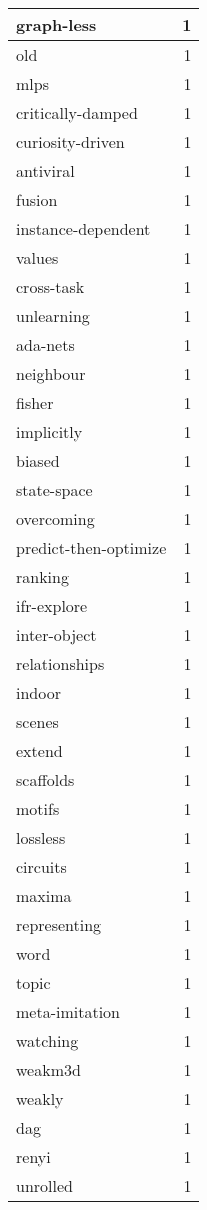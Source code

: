 \begin{table}[h]
\begin{tabular}{|l|r|}
\hline
graph-less & 1 \\
\hline
old & 1 \\
\hline
mlps & 1 \\
\hline
critically-damped & 1 \\
\hline
curiosity-driven & 1 \\
\hline
antiviral & 1 \\
\hline
fusion & 1 \\
\hline
instance-dependent & 1 \\
\hline
values & 1 \\
\hline
cross-task & 1 \\
\hline
unlearning & 1 \\
\hline
ada-nets & 1 \\
\hline
neighbour & 1 \\
\hline
fisher & 1 \\
\hline
implicitly & 1 \\
\hline
biased & 1 \\
\hline
state-space & 1 \\
\hline
overcoming & 1 \\
\hline
predict-then-optimize & 1 \\
\hline
ranking & 1 \\
\hline
ifr-explore & 1 \\
\hline
inter-object & 1 \\
\hline
relationships & 1 \\
\hline
indoor & 1 \\
\hline
scenes & 1 \\
\hline
extend & 1 \\
\hline
scaffolds & 1 \\
\hline
motifs & 1 \\
\hline
lossless & 1 \\
\hline
circuits & 1 \\
\hline
maxima & 1 \\
\hline
representing & 1 \\
\hline
word & 1 \\
\hline
topic & 1 \\
\hline
meta-imitation & 1 \\
\hline
watching & 1 \\
\hline
weakm3d & 1 \\
\hline
weakly & 1 \\
\hline
dag & 1 \\
\hline
renyi & 1 \\
\hline
unrolled & 1 \\

\end{tabular}
\end{table}
